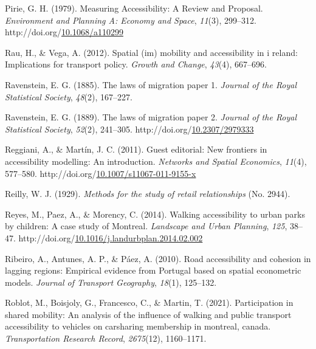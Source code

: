 \documentclass[
11pt, %
oneside, %
english, %
singlespacing, %
]{macthesis} %
\newlength{\cslhangindent}
\newenvironment{CSLReferences}[2] %
{\begin{list}{}{%
	\setlength{\itemindent}{0pt}
	\setlength{\leftmargin}{0pt}
	\setlength{\parsep}{0pt}
	\ifodd #1
	\setlength{\leftmargin}{\cslhangindent}
	\setlength{\itemindent}{-1\cslhangindent}
	\fi
	\setlength{\itemsep}{#2\baselineskip}}}
{\end{list}}
\begin{document}
\begin{CSLReferences}{1}{0}
Pirie, G. H. (1979). Measuring {Accessibility}: {A} {Review} and {Proposal}. \emph{Environment and Planning A: Economy and Space}, \emph{11}(3), 299--312. http://doi.org/\href{https://doi.org/10.1068/a110299}{10.1068/a110299}

Rau, H., \& Vega, A. (2012). Spatial (im) mobility and accessibility in i reland: Implications for transport policy. \emph{Growth and Change}, \emph{43}(4), 667--696.

Ravenstein, E. G. (1885). The laws of migration paper 1. \emph{Journal of the Royal Statistical Society}, \emph{48}(2), 167--227.

Ravenstein, E. G. (1889). The laws of migration paper 2. \emph{Journal of the Royal Statistical Society}, \emph{52}(2), 241--305. http://doi.org/\href{https://doi.org/10.2307/2979333}{10.2307/2979333}

Reggiani, A., \& Martín, J. C. (2011). Guest editorial: New frontiers in accessibility modelling: An introduction. \emph{Networks and Spatial Economics}, \emph{11}(4), 577--580. http://doi.org/\href{https://doi.org/10.1007/s11067-011-9155-x}{10.1007/s11067-011-9155-x}

Reilly, W. J. (1929). \emph{Methods for the study of retail relationships} (No. 2944).

Reyes, M., Paez, A., \& Morency, C. (2014). Walking accessibility to urban parks by children: {A} case study of {Montreal}. \emph{Landscape and Urban Planning}, \emph{125}, 38--47. http://doi.org/\href{https://doi.org/10.1016/j.landurbplan.2014.02.002}{10.1016/j.landurbplan.2014.02.002}

Ribeiro, A., Antunes, A. P., \& Páez, A. (2010). Road accessibility and cohesion in lagging regions: {Empirical} evidence from {Portugal} based on spatial econometric models. \emph{Journal of Transport Geography}, \emph{18}(1), 125--132.

Roblot, M., Boisjoly, G., Francesco, C., \& Martin, T. (2021). Participation in shared mobility: An analysis of the influence of walking and public transport accessibility to vehicles on carsharing membership in montreal, canada. \emph{Transportation Research Record}, \emph{2675}(12), 1160--1171.


\end{CSLReferences}
\end{document}
